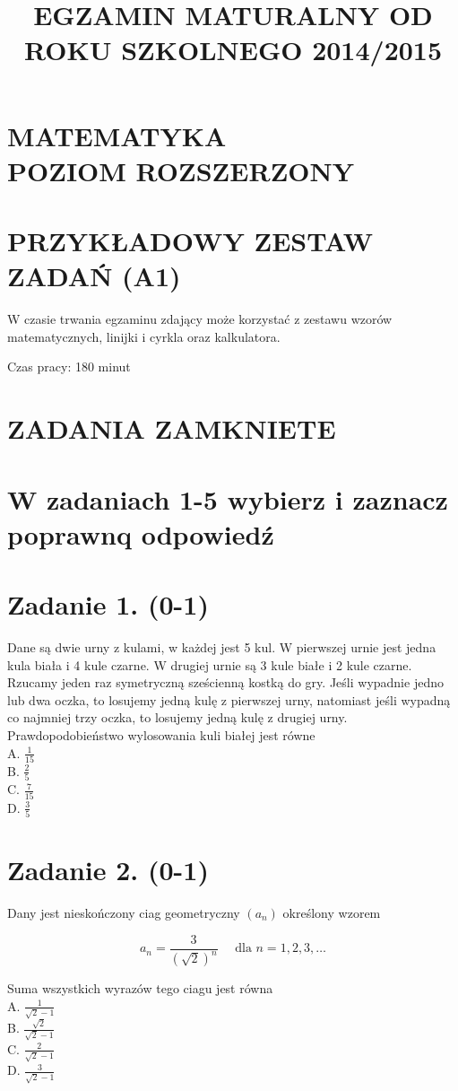 \documentclass[10pt]{article}
\title{EGZAMIN MATURALNY OD ROKU SZKOLNEGO 2014/2015 }
\author{}
\date{}
\begin{document}
\maketitle
\section*{MATEMATYKA \\
 POZIOM ROZSZERZONY}
\section*{PRZYKŁADOWY ZESTAW ZADAŃ (A1)}
W czasie trwania egzaminu zdający może korzystać z zestawu wzorów matematycznych, linijki i cyrkla oraz kalkulatora.

Czas pracy: 180 minut

\section*{ZADANIA ZAMKNIETE}
\section*{W zadaniach 1-5 wybierz i zaznacz poprawnq odpowiedź}
\section*{Zadanie 1. (0-1)}
Dane są dwie urny z kulami, w każdej jest 5 kul. W pierwszej urnie jest jedna kula biała i 4 kule czarne. W drugiej urnie są 3 kule białe i 2 kule czarne. Rzucamy jeden raz symetryczną sześcienną kostką do gry. Jeśli wypadnie jedno lub dwa oczka, to losujemy jedną kulę z pierwszej urny, natomiast jeśli wypadną co najmniej trzy oczka, to losujemy jedną kulę z drugiej urny. Prawdopodobieństwo wylosowania kuli białej jest równe\\
A. \(\frac{1}{15}\)\\
B. \(\frac{2}{5}\)\\
C. \(\frac{7}{15}\)\\
D. \(\frac{3}{5}\)

\section*{Zadanie 2. (0-1)}
Dany jest nieskończony ciag geometryczny \(\left(a_{n}\right)\) określony wzorem

\[
a_{n}=\frac{3}{(\sqrt{2})^{n}} \quad \text { dla } n=1,2,3, \ldots
\]

Suma wszystkich wyrazów tego ciagu jest równa\\
A. \(\frac{1}{\sqrt{2}-1}\)\\
B. \(\frac{\sqrt{2}}{\sqrt{2}-1}\)\\
C. \(\frac{2}{\sqrt{2}-1}\)\\
D. \(\frac{3}{\sqrt{2}-1}\)
\end{document}
